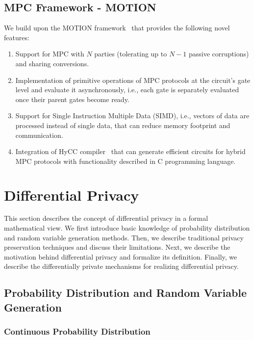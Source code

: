 \subsection{MPC Framework - MOTION}
\label{subsection:MOTIONFramework}
We build upon the MOTION framework~\cite{braun2020motion} that provides the following novel features:
\begin{enumerate}
    \item Support for MPC with $N$ parties (tolerating up to $N-1$ passive corruptions) and sharing conversions.
    \item Implementation of primitive operations of MPC protocols at the circuit's gate level and evaluate it asynchronously, i.e., each gate is separately evaluated once their parent gates become ready.
    \item Support for Single Instruction Multiple Data (SIMD), i.e., vectors of data are processed instead of single data, that can reduce memory footprint and communication.
    \item Integration of HyCC compiler~\cite{buscher2018hycc} that can generate efficient circuits for hybrid MPC protocols with functionality described in C programming language.
\end{enumerate}



\section{Differential Privacy}
\label{sec:differentialPrivacy}
This section describes the concept of differential privacy in a formal mathematical view. We first introduce basic knowledge of probability distribution and random variable generation methods. Then, we describe traditional privacy preservation techniques and discuss their limitations. Next, we describe the motivation behind differential privacy and formalize its definition. Finally, we describe the differentially private mechanisms for realizing differential privacy.

\subsection{Probability Distribution and Random Variable Generation}
\label{subsec:probabilityDistribution}

\subsubsection{Continuous Probability Distribution}
\label{subsubsec:ContinuousProbabilityDistribution}

